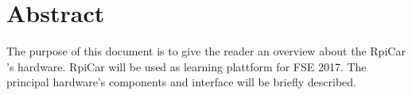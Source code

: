 \documentclass[
12pt, %
a4paper, %
oneside, %
headinclude,footinclude, %
BCOR5mm, %
]{scrartcl}
\title{\normalfont\spacedallcaps{RPi based autonomous Car}} %
\author{\spacedlowsmallcaps{Fullstack Embedded (2017)}}
\date{} %
\begin{document}

\renewcommand{\sectionmark}[1]{\markright{\spacedlowsmallcaps{#1}}} %
\lehead{\mbox{\llap{\small\thepage\kern1em\color{halfgray} \vline}\color{halfgray}\hspace{0.5em}\rightmark\hfil}} %

\pagestyle{scrheadings} %


\maketitle %

\setcounter{tocdepth}{2} %

\tableofcontents %

\listoffigures %

\listoftables %


\section*{Abstract} %
The purpose of this document is to give the reader an overview about the RpiCar 's hardware. RpiCar will be used as learning plattform for FSE 2017. The principal hardware's components and interface will be briefly described.
\end{document}
